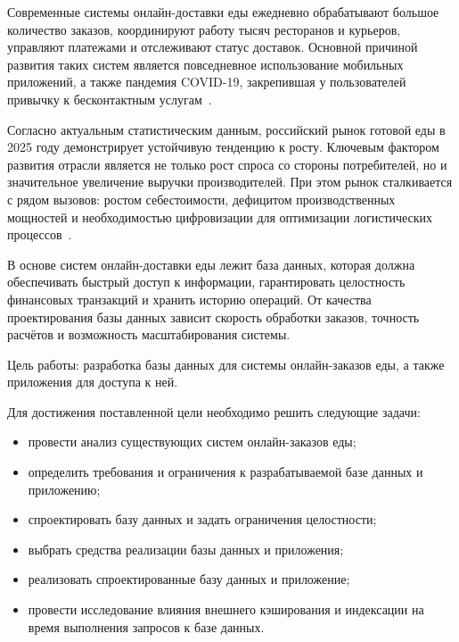 
Современные системы онлайн-доставки еды ежедневно обрабатывают большое количество заказов, координируют работу тысяч ресторанов и курьеров, управляют платежами и отслеживают статус доставок. Основной причиной развития таких систем является повседневное использование мобильных приложений, а также пандемия COVID-19, закрепившая у пользователей привычку к бесконтактным услугам~\cite{ref:covid-19}.

Согласно актуальным статистическим данным, российский рынок готовой еды в 2025 году демонстрирует устойчивую тенденцию к росту. Ключевым фактором развития отрасли является не только рост спроса со стороны потребителей, но и значительное увеличение выручки производителей. При этом рынок сталкивается с рядом вызовов: ростом себестоимости, дефицитом производственных мощностей и необходимостью цифровизации для оптимизации логистических процессов~\cite{ref:growing}.

В основе систем онлайн-доставки еды лежит база данных, которая должна обеспечивать быстрый доступ к информации, гарантировать целостность финансовых транзакций и хранить историю операций. От качества проектирования базы данных зависит скорость обработки заказов, точность расчётов и возможность масштабирования системы.

Цель работы: разработка базы данных для системы онлайн-заказов еды, а также приложения для доступа к ней.

Для достижения поставленной цели необходимо решить следующие задачи:
\begin{itemize}
    \item провести анализ существующих систем онлайн-заказов еды;
    \item определить требования и ограничения к разрабатываемой базе данных и приложению;
    \item спроектировать базу данных и задать ограничения целостности;
    \item выбрать средства реализации базы данных и приложения;
    \item реализовать спроектированные базу данных и приложение;
    \item провести исследование влияния внешнего кэширования и индексации на время выполнения запросов к базе данных.
\end{itemize}
